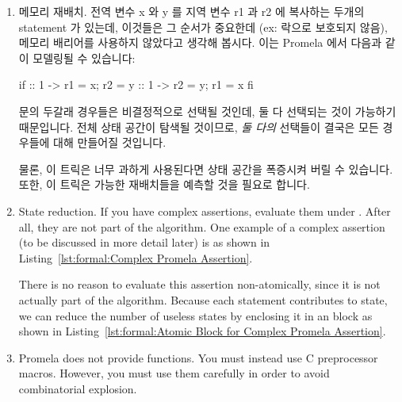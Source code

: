 \begin{enumerate}
\item	메모리 재배치.
	전역 변수 x 와 y 를 지역 변수 r1 과 r2 에 복사하는 두개의 statement 가
	있는데, 이것들은 그 순서가 중요한데 (ex: 락으로 보호되지 않음), 메모리
	배리어를 사용하지 않았다고 생각해 봅시다.
	이는 Promela 에서 다음과 같이 모델링될 수 있습니다:
\iffalse

\item	Memory reordering.  Suppose you have a pair of statements
	copying globals x and y to locals r1 and r2, where ordering
	matters (e.g., unprotected by locks), but where you have
	no memory barriers.  This can be modeled in Promela as follows:
\fi

\begin{VerbatimN}[samepage=true]
if
:: 1 -> r1 = x;
        r2 = y
:: 1 -> r2 = y;
        r1 = x
fi
\end{VerbatimN}

	 문의 두갈래 경우들은 비결정적으로 선택될 것인데, 둘 다 선택되는
	것이 가능하기 때문입니다.
	전체 상태 공간이 탐색될 것이므로, \emph{둘 다의} 선택들이 결국은 모든
	경우들에 대해 만들어질 것입니다.

	물론, 이 트릭은 너무 과하게 사용된다면 상태 공간을 폭증시켜 버릴 수
	있습니다.
	또한, 이 트릭은 가능한 재배치들을 예측할 것을 필요로 합니다.
	\iffalse

	The two branches of the \co{if} statement will be selected
	nondeterministically, since they both are available.
	Because the full state space is searched, \emph{both} choices
	will eventually be made in all cases.

	Of course, this trick will cause your state space to explode
	if used too heavily.
	In addition, it requires you to anticipate possible reorderings.
	\fi

\item	State reduction.  If you have complex assertions, evaluate
	them under .  After all, they are not part of the
	algorithm.  One example of a complex assertion (to be discussed
	in more detail later) is as shown in
	Listing~\ref{lst:formal:Complex Promela Assertion}.

	There is no reason to evaluate this assertion
	non-atomically, since it is not actually part of the algorithm.
	Because each statement contributes to state, we can reduce
	the number of useless states by enclosing it in an 
	block as shown in
	Listing~\ref{lst:formal:Atomic Block for Complex Promela Assertion}.

\item	Promela does not provide functions.
	You must instead use C preprocessor macros.
	However, you must use them carefully in order to avoid
	combinatorial explosion.
\end{enumerate}

